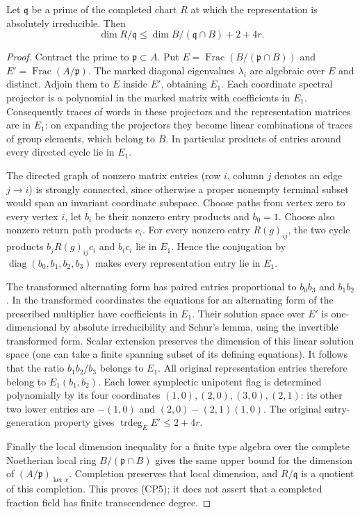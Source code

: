 \begin{lemma}
\label{lem:rh-four-fibre}
Let $\mathfrak q$ be a prime of the completed chart $R$
at which the representation is absolutely irreducible.
Then
\[
 \dim R/\mathfrak q
 \leq\dim B/(\mathfrak q\cap B)+2+4r.                 \tag{CP5}
\]
\end{lemma}
\begin{proof}
Contract the prime to $\mathfrak p\subset A$. Put
$E=\operatorname{Frac}(B/(\mathfrak p\cap B))$ and
$E'=\operatorname{Frac}(A/\mathfrak p)$.
The marked diagonal eigenvalues $\lambda_i$ are
algebraic over $E$ and distinct. Adjoin them to
$E$ inside $E'$, obtaining $E_1$. Each coordinate
spectral projector is a polynomial in the marked
matrix with coefficients in $E_1$. Consequently
traces of words in these projectors and the
representation matrices are in $E_1$: on expanding
the projectors they become linear combinations of
traces of group elements, which belong to $B$.
In particular products of entries around every
directed cycle lie in $E_1$.

The directed graph of nonzero matrix entries
(row $i$, column $j$ denotes an edge $j\to i$)
is strongly connected, since otherwise a proper
nonempty terminal subset would span an invariant
coordinate subspace. Choose paths from vertex zero
to every vertex $i$, let $b_i$ be their nonzero
entry products and $b_0=1$. Choose also nonzero
return path products $c_i$. For every nonzero
entry $R(g)_{ij}$, the two cycle products
$b_j R(g)_{ij}c_i$ and $b_ic_i$ lie in $E_1$.
Hence the conjugation by
$\operatorname{diag}(b_0,b_1,b_2,b_3)$ makes every
representation entry lie in $E_1$.

The transformed alternating form has paired entries
proportional to $b_0b_3$ and $b_1b_2$. In the
transformed coordinates the equations for an
alternating form of the prescribed multiplier
have coefficients in $E_1$. Their solution space
over $E'$ is one-dimensional by absolute
irreducibility and Schur's lemma, using the
invertible transformed form. Scalar extension
preserves the dimension of this linear solution
space (one can take a finite spanning subset of
its defining equations). It follows that the
ratio $b_1b_2/b_3$ belongs to $E_1$.
All original representation entries therefore
belong to $E_1(b_1,b_2)$. Each lower symplectic
unipotent flag is determined polynomially by its
four coordinates $(1,0),(2,0),(3,0),(2,1)$:
its other two lower entries are
$-(1,0)$ and $(2,0)-(2,1)(1,0)$.
The original entry-generation property gives
$\operatorname{trdeg}_E E'\leq2+4r$.

Finally the local dimension inequality for a
finite type algebra over the complete Noetherian
local ring $B/(\mathfrak p\cap B)$ gives the same
upper bound for the dimension of
$(A/\mathfrak p)_{\ker x}$. Completion preserves
that local dimension, and $R/\mathfrak q$ is a
quotient of this completion. This proves (CP5);
it does not assert that a completed fraction field
has finite transcendence degree.
\end{proof}

